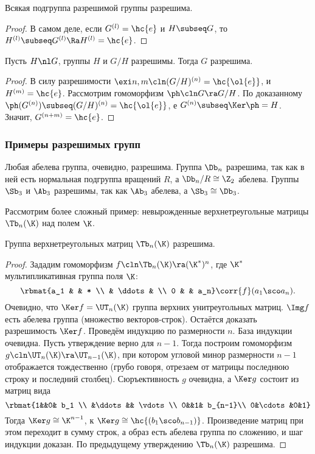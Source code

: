 \documentclass[a4paper]{article}
\begin{document}
\begin{imp}
Всякая подгруппа разрешимой группы разрешима.
\end{imp}
\begin{proof}
В самом деле, если $G^{(l)}=\hc{e}$ и $H \subseq G$, то $H^{(l)}\subseq G^{(l)} \Ra H^{(l)} = \hc{e}$.
\end{proof}

\begin{stm}
Пусть $H \nl G$, группы $H$ и $G/H$ разрешимы. Тогда $G$ разрешима.
\end{stm}
\begin{proof}
В силу разрешимости $\exi n, m\cln (G/H)^{(n)}=\hc{\ol{e}}$, и $H^{(m)}=\hc{e}$.
Рассмотрим гомоморфизм $\ph\cln G \ra G/H$. По доказанному $\ph(G^{(n)}) \subseq (G/H)^{(n)}=\hc{\ol{e}}$, е
$G^{(n)} \subseq \Ker \ph = H$. Значит, $G^{(n+m)}=\hc{e}$.
\end{proof}

\subsubsection{Примеры разрешимых групп}

Любая абелева группа, очевидно, разрешима. Группа $\Db_n$ разрешима, так как в ней есть нормальная подгруппа
вращений $R$, а $\Db_n/R \cong \Z_2$ абелева.
Группы $\Sb_3$ и $\Ab_3$ разрешимы, так как $\Ab_3$ абелева, а $\Sb_3 \cong \Db_3$.

Рассмотрим более сложный пример: невырожденные верхнетреугольные матрицы $\Tb_n(\K)$ над полем $\K$.

\begin{stm}
Группа верхнетреугольных матриц $\Tb_n(\K)$ разрешима.
\end{stm}
\begin{proof}
Зададим гомоморфизм $f\cln \Tb_n(\K) \ra (\K^*)^n$, где $\K^*$ мультипликативная группа поля $\K$:
$$\rbmat{a_1 & & * \\ & \ddots & \\ 0 & & a_n} \corr{f} (a_1 \sco a_n).$$
Очевидно, что $\Ker f = \UT_n(\K)$ группа верхних унитреугольных матриц. $\Img f$ есть абелева  группа
(множество векторов-строк). Остаётся доказать разрешимость $\Ker f$. Проведём индукцию по размерности $n$.
База индукции очевидна. Пусть утверждение верно для $n-1$. Тогда построим гомоморфизм $g\cln \UT_n(\K) \ra
\UT_{n-1}(\K)$, при котором угловой минор размерности $n-1$ отображается тождественно (грубо говоря, отрезаем
от матрицы последнюю строку и последний столбец). Сюръективность $g$ очевидна, а $\Ker g$ состоит из матриц
вида
$$\rbmat{1&&0& b_1 \\ &\ddots&& \vdots \\ 0&&1& b_{n-1}\\ 0&\cdots&0&1}$$
Тогда $\Ker g \cong \K^{n-1}$, к $\Ker g \cong \hc{(b_1 \sco b_{n-1})}$. Произведение матриц при  этом
переходит в сумму строк, а образ есть абелева группа по сложению, и шаг индукции доказан. По предыдущему
утверждению $\Tb_n(\K)$ разрешима.
\end{proof}
\end{document}
